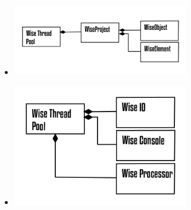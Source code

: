 \documentclass[10pt]{beamer}
\theoremstyle{remark}
\theoremstyle{definition}
\begin{document}
\begin{frame}[allowframebreaks]
\begin{itemize}
		\end{itemize}
		
		\framebreak
		\begin{itemize}
			
			\item \includegraphics[width=0.6\textwidth]{images/Prancheta 14@4x.png}
			
		\end{itemize}
		
		\framebreak
		\begin{itemize}
			
			\item \includegraphics[width=0.6\textwidth]{images/Prancheta 15@4x.png}
			
		\end{itemize}
		
	\end{frame}
	
\end{document}
